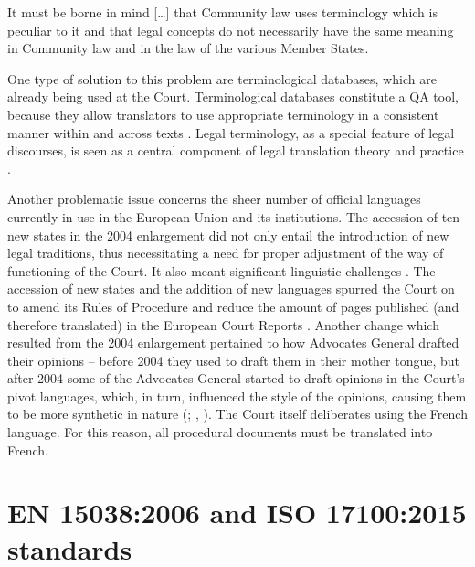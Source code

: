 \documentclass[output=paper]{langsci/langscibook}
\begin{document}
It must be borne in mind […] that Community law uses terminology which is peculiar to it and that legal concepts do not necessarily have the same meaning in Community law and in the law of the various Member States.

One type of solution to this problem are terminological databases, which are already being used at the Court. Terminological databases constitute a QA tool, because they allow translators to use appropriate terminology in a consistent manner within and across texts \citep[166]{Lušicky2017}. Legal terminology, as a special feature of legal discourses, is seen as a central component of legal translation theory and practice \citep[15]{PrietoRamos2015}.

Another problematic issue concerns the sheer number of official languages currently in use in the European Union and its institutions. The accession of ten new states in the 2004 enlargement did not only entail the introduction of new legal traditions, thus necessitating a need for proper adjustment of the way of functioning of the Court. It also meant significant linguistic challenges \citep[812]{McAuliffe2008}. The accession of new states and the addition of new languages spurred the Court on to amend its Rules of Procedure and reduce the amount of pages published (and therefore translated) in the European Court Reports \citep{McAuliffe2008}. Another change which resulted from the 2004 enlargement pertained to how Advocates General drafted their opinions – before 2004 they used to draft them in their mother tongue, but after 2004 some of the Advocates General started to draft opinions in the Court’s pivot languages, which, in turn, influenced the style of the opinions, causing them to be more synthetic in nature (\citealt[816]{McAuliffe2008}; \citealt[254]{McAuliffe2010}, \citeyear[9]{McAuliffe2012}). The Court itself deliberates using the French language. For this reason, all procedural documents must be translated into French.

\section{EN 15038:2006 and ISO 17100:2015 standards}\label{sec:kozbial:3}
\end{document}
